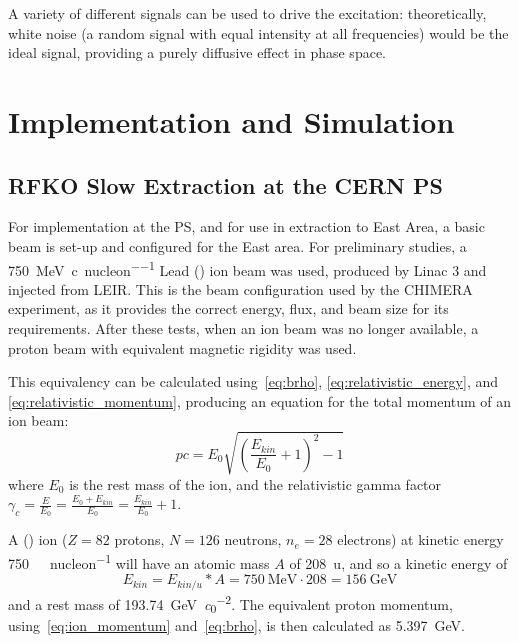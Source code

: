 \documentclass[11pt]{report}
\begin{document}
A variety of different signals can be used to drive the excitation: theoretically, white noise (a random signal with equal intensity at all frequencies) would be the ideal signal, providing a purely diffusive effect in phase space. 

\chapter{Implementation and Simulation}

\section{RFKO Slow Extraction at the CERN PS}

For implementation at the PS, and for use in extraction to East Area, a basic beam is set-up and configured for the East area. For preliminary studies, a \qty[per-mode=symbol]{750}{\mega\electronvolt\per~c\per nucleon} Lead () ion beam was used, produced by Linac 3 and injected from LEIR. This is the beam configuration used by the CHIMERA experiment, as it provides the correct energy, flux, and beam size for its requirements. After these tests, when an ion beam was no longer available, a proton beam with equivalent magnetic rigidity was used.

This equivalency can be calculated using~\autoref{eq:brho}, \autoref{eq:relativistic_energy}, and \autoref{eq:relativistic_momentum}, producing an equation for the total momentum of an ion beam:
\begin{equation}
  pc=E_0\sqrt{\left( \frac{E_{kin}}{E_0}+1\right)^2-1}
  \label{eq:ion_momentum}
\end{equation} where $E_0$ is the rest mass of the ion, and the relativistic gamma factor $\gamma_c = \frac{E}{E_0}=\frac{E_0+E_{kin}}{E_0}=\frac{E_{kin}}{E_0}+1$.

A () ion ($Z=82$ protons, $N=126$ neutrons, $n_e=28$ electrons) at kinetic energy \qty[per-mode=symbol]{750}{\mega\eVperc\per nucleon} will have an atomic mass $A$ of \qty{208}{\atomicmassunit}, and so a kinetic energy of 
\begin{equation}
  E_{kin}=E_{kin/u}*A=\qty{750}{\mega\electronvolt}\cdot 208=\qty{156}{\giga\electronvolt}
\end{equation}
and a rest mass of \qty{193.74}{\giga\electronvolt\per\clight\squared}. The equivalent proton momentum, using~\autoref{eq:ion_momentum} and~\autoref{eq:brho}, is then calculated as \qty{5.397}{\giga\electronvolt}. 
\end{document}
